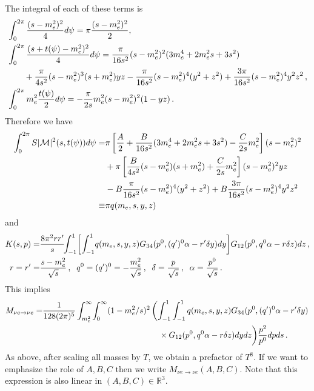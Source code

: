   The integral of each of these terms is
 \begin{align}
&\int_0^{2\pi}\frac{(s-m_e^2)^2}{4} d\psi=\pi\frac{(s-m_e^2)^2}{2},\\
&\int_0^{2\pi}\frac{(s+t(\psi)-m_e^2)^2}{4}d\psi=\frac{\pi}{16s^2}(s-m_e^2)^2(3m_e^4+2m_e^2s+3s^2)\notag\\
&\qquad+\frac{\pi}{4s^2}(s-m_e^2)^3(s+m_e^2)yz
-\frac{\pi}{16s^2}(s-m_e^2)^4(y^2+z^2)+\frac{3\pi}{16s^2}(s-m_e^2)^4y^2z^2\,,\notag\\
&\int_0^{2\pi} m_e^2\frac{t(\psi)}{2}d\psi=-\frac{\pi}{2s}m_e^2(s-m_e^2)^2(1-yz)\,.\notag
\end{align}
Therefore we have
\begin{align}
\int_0^{2\pi} S |\mathcal{M}|^2 (s,t(\psi))d\psi=&\pi\left[\frac{A}{2}+\frac{B}{16s^2}(3m_e^4+2m_e^2s+3s^2)-\frac{C}{2s}m_e^2\right](s-m_e^2)^2\notag\\
&+\pi\left[\frac{B}{4s^2}(s-m_e^2)(s+m_e^2)+\frac{C}{2s}m_e^2\right](s-m_e^2)^2yz\notag\\
&-B\frac{\pi}{16s^2}(s-m_e^2)^4(y^2+z^2)+B\frac{3\pi}{16s^2}(s-m_e^2)^4y^2z^2\notag\\
\equiv& \pi q(m_e,s,y,z)
\end{align}
and
\begin{align}
K(s,p)=&\frac{8\pi^2 rr^{\prime}}{s}\!\!\int_{-1}^1 \!\left[\int_{-1}^1 \! q(m_e,s,y,z) G_{34}(p^0,(q^{\prime})^0\alpha-r^{\prime}\delta y) dy\right] \!G_{12}(p^0,q^0\alpha-r\delta z)dz\,,\\
r=r^{\prime}=&\frac{s-m_e^2}{\sqrt{s}}\,,\hspace{2mm} q^0=(q^{\prime})^0=-\frac{m_e^2}{\sqrt{s}}\,,\hspace{2mm} \delta=\frac{p}{\sqrt{s}}\,,\hspace{2mm}  \alpha=\frac{p^0}{\sqrt{s}}\,.\notag
\end{align}
This implies
\begin{align}
M_{\nu e\rightarrow\nu e}=&\frac{1}{128(2\pi)^5 }\int_{m_e^2}^\infty\!\int_0^\infty (1-m_e^2/s)^2\left(\int_{-1}^1 \int_{-1}^1 q(m_e,s,y,z) G_{34}(p^0,(q^{\prime})^0\alpha-r^{\prime}\delta y)\right.\\
&\hspace{50mm}\times  G_{12}(p^0,q^0\alpha-r\delta z)dydz\bigg)\frac{ p^2}{p^0}dpds\,.\notag
\end{align}
As above, after scaling all masses by $T$, we obtain a prefactor of $T^8$. If we want to emphasize the role of $A,B,C$ then we write $M_{\nu e\rightarrow\nu e}(A,B,C)$.  Note that this expression is also linear in $(A,B,C)\in\mathbb{R}^3$.


